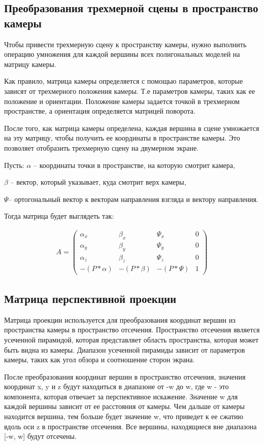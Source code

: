 \subsection{Преобразования трехмерной сцены в пространство камеры}
Чтобы привести трехмерную сцену к пространству камеры, нужно выполнить операцию умножения для каждой вершины всех полигональных моделей на матрицу камеры.


Как правило, матрица камеры определяется с помощью параметров, которые зависят от трехмерного положения камеры. Т.е параметров камеры, таких как ее положение и ориентации. Положение камеры задается точкой в трехмерном пространстве, а ориентация определяется матрицей поворота.


После того, как матрица камеры определена, каждая вершина в сцене умножается на эту матрицу, чтобы получить ее координаты в пространстве камеры. Это позволяет отобразить трехмерную сцену на двумерном экране.

Пусть:
$\alpha$ – координаты точки в пространстве, на которую смотрит камера,

$\beta$ – вектор, который указывает, куда смотрит верх камеры, 

$\Psi$– ортогональный вектор к векторам направления взгляда и вектору направления.

Тогда матрица будет выглядеть так:

\begin{align}
	A = 
	\begin{pmatrix}	
	\alpha_x & \beta_x & \Psi_x & 0 \\
	\alpha_y & \beta_y & \Psi_y & 0\\
	\alpha_z & \beta_z & \Psi_z & 0\\
	-(P * \alpha) & -(P * \beta) & -(P * \Psi) & 1
	\end{pmatrix}
\end{align}
\subsection{Матрица перспективной проекции}
Матрица проекции используется для преобразования координат вершин из пространства камеры в пространство отсечения. Пространство отсечения является усеченной пирамидой, которая представляет область пространства, которая может быть видна из камеры. Диапазон усеченной пирамиды зависит от параметров камеры, таких как угол обзора и соотношение сторон экрана.


После преобразования координат вершин в пространство отсечения, значения координат x, y и z будут находиться в диапазоне от -w до w, где w - это компонента, которая отвечает за перспективное искажение. Значение w для каждой вершины зависит от ее расстояния от камеры. Чем дальше от камеры находится вершина, тем больше будет значение w, что приведет к ее сжатию вдоль оси z в пространстве отсечения. Все вершины, находящиеся вне диапазона [-w, w] будут отсечены.


